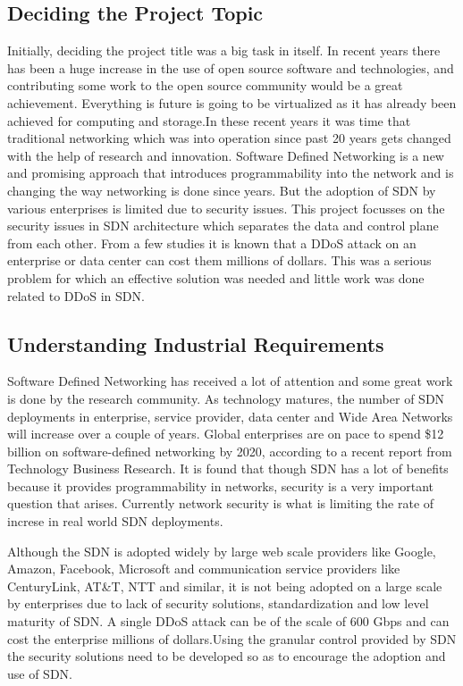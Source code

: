 \documentclass[12pt,a4paper,final]{report}
\begin{document}
\subsection{Deciding the Project Topic}
Initially, deciding the project title was a big task in itself. In recent years there has been a huge increase in the use of open source software and technologies, and contributing some work to the open source community would be a great achievement. Everything is future is going to be virtualized as it has already been achieved for computing and storage.In these recent years it was time that traditional networking which was into operation since past 20 years gets changed with the help of research and innovation. Software Defined Networking\cite{BasePaper1}\cite{BasePaper2}\cite{BasePaper3} is a new and promising approach that introduces programmability into the network and is changing the way networking is done since years. But the adoption of SDN by various enterprises is limited due to security issues.
 This project focusses on the security issues in SDN architecture which separates the data and control plane from each other. From a few studies it is known that a DDoS attack on an enterprise or data center can cost them millions of dollars. This was a serious problem for which an effective solution was needed and little work was done related to DDoS in SDN\cite{BasePaper4}\cite{BasePaper5}.  

\subsection{Understanding Industrial Requirements}
Software Defined Networking has received a lot of attention and some great work is done by the
research community. As technology matures, the number of SDN deployments in enterprise, service
provider, data center and Wide Area Networks will increase over a couple of years. Global enterprises are on pace to spend \$12 billion on software-defined networking by 2020, according to a recent report from Technology Business Research. It is found that though SDN has a lot of benefits because it provides programmability in networks, security is a very important question that arises. Currently network security is what is limiting the rate of increse in real world SDN deployments.

Although the SDN is adopted widely by large web scale providers like Google, Amazon, Facebook, Microsoft and communication service providers like CenturyLink, AT\&T, NTT and similar, it is not being adopted on a large scale by enterprises due to lack of security solutions, standardization and low level maturity of SDN.  A single DDoS attack can be of the scale of 600 Gbps and can cost the enterprise millions of dollars.Using the granular control provided by SDN the security solutions need to be developed so as to encourage the adoption and use of SDN. 
\end{document}
